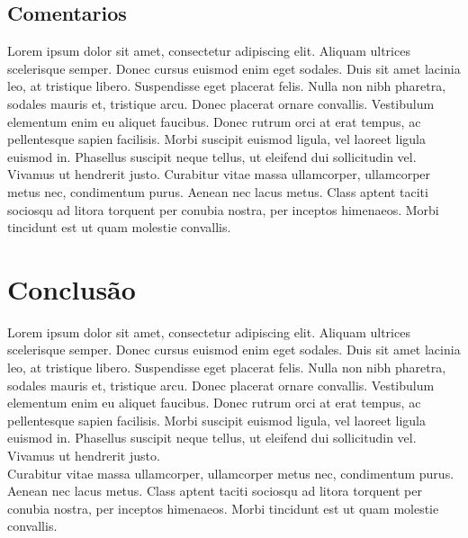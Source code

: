 \documentclass[twoside]{article}
\begin{document}
\begin{multicols}{2}
\subsection{ Comentarios }
\indent Lorem ipsum dolor sit amet, consectetur adipiscing elit. Aliquam ultrices scelerisque semper. Donec cursus euismod enim eget sodales. Duis sit amet lacinia leo, at tristique libero. Suspendisse eget placerat felis. Nulla non nibh pharetra, sodales mauris et, tristique arcu. Donec placerat ornare convallis. Vestibulum elementum enim eu aliquet faucibus. Donec rutrum orci at erat tempus, ac pellentesque sapien facilisis. Morbi suscipit euismod ligula, vel laoreet ligula euismod in. Phasellus suscipit neque tellus, ut eleifend dui sollicitudin vel. Vivamus ut hendrerit justo. Curabitur vitae massa ullamcorper, ullamcorper metus nec, condimentum purus. Aenean nec lacus metus. Class aptent taciti sociosqu ad litora torquent per conubia nostra, per inceptos himenaeos. Morbi tincidunt est ut quam molestie convallis.



\section{Conclusão}
\indent	Lorem ipsum dolor sit amet, consectetur adipiscing elit. Aliquam ultrices scelerisque semper. Donec cursus euismod enim eget sodales. Duis sit amet lacinia leo, at tristique libero. Suspendisse eget placerat felis. Nulla non nibh pharetra, sodales mauris et, tristique arcu. Donec placerat ornare convallis. Vestibulum elementum enim eu aliquet faucibus. Donec rutrum orci at erat tempus, ac pellentesque sapien facilisis. Morbi suscipit euismod ligula, vel laoreet ligula euismod in. Phasellus suscipit neque tellus, ut eleifend dui sollicitudin vel. Vivamus ut hendrerit justo. 
\\
\indent Curabitur vitae massa ullamcorper, ullamcorper metus nec, condimentum purus. Aenean nec lacus metus. Class aptent taciti sociosqu ad litora torquent per conubia nostra, per inceptos himenaeos. Morbi tincidunt est ut quam molestie convallis.





\end{multicols}
\end{document}
